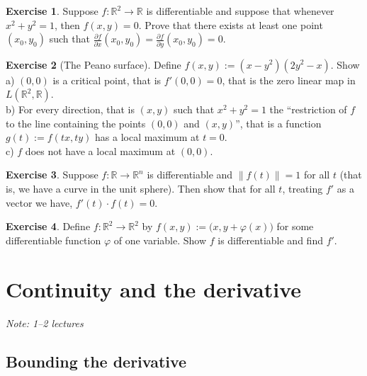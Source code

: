 \documentclass[12pt]{book}
\newcommand{\snorm}[1]{\lVert {#1} \rVert}
\newcommand{\R}{{\mathbb{R}}}
\newcommand{\myindex}[1]{#1\index{#1}}
\newcommand{\sectionnotes}[1]{\noindent \emph{Note: #1} \medskip \par}
\newcommand{\sectionnewpage}{\clearpage}
\theoremstyle{plain}
\theoremstyle{remark}
\theoremstyle{definition}
\theoremstyle{exercise}
\newtheorem{exercise}{Exercise}[section]
\theoremstyle{example}
\begin{document}
\begin{exercise}
Suppose $f \colon \R^2 \to \R$ is differentiable and suppose that
whenever $x^2+y^2 = 1$, then $f(x,y) = 0$.  Prove that there exists at least
one point $(x_0,y_0)$ such that
$\frac{\partial f}{\partial x}(x_0,y_0) = \frac{\partial f}{\partial
y}(x_0,y_0) = 0$.
\end{exercise}

\begin{exercise}[The \myindex{Peano surface}]
Define $f(x,y) := ( x-y^2 ) ( 2 y^2 - x)$.  Show\\
a) $(0,0)$ is a critical point, that is $f'(0,0) = 0$, that is the zero
linear map in $L(\R^2,\R)$.\\
b) For every direction, that is $(x,y)$ such that $x^2+y^2=1$ the
``restriction of $f$ to the line containing the points $(0,0)$ and
$(x,y)$'', that is a function $g(t) := f(tx,ty)$ has a local maximum at
$t=0$.\\
c) $f$ does not have a local maximum at $(0,0)$.
\end{exercise}

\begin{exercise}
Suppose $f \colon \R \to \R^n$ is differentiable and $\snorm{f(t)} = 1$ for
all $t$ (that is, we have a curve in the unit sphere).  Then show that for
all $t$, treating $f'$ as a vector we have, $f'(t) \cdot f(t) = 0$.
\end{exercise}

\begin{exercise}
Define $f \colon \R^2 \to \R^2$ by $f(x,y) :=
\bigl(x,y+\varphi(x)\bigr)$ for some differentiable function $\varphi$ of one
variable.  Show $f$ is differentiable and find $f'$.
\end{exercise}




\sectionnewpage
\section{Continuity and the derivative}
\label{sec:svthedercont}

\sectionnotes{1--2 lectures}

\subsection{Bounding the derivative}
\end{document}
